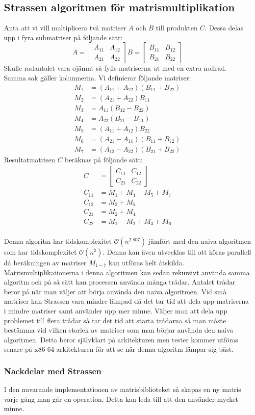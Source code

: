 \subsection{Strassen algoritmen för matrismultiplikation}
\label{sec:strassen}
Anta att vi vill multiplicera två matriser $A$ och $B$ till produkten $C$. Dessa delas upp i fyra submatriser på följande sätt:
 $$A=\begin{bmatrix}
A_{11} & A_{12} \\
A_{21}& A_{22}
 \end{bmatrix}
 B=\begin{bmatrix}
B_{11} & B_{12} \\
B_{21}& B_{22}
 \end{bmatrix}
 $$
 Skulle radantalet vara ojämnt så fylls matriserna ut med en extra nollrad. Samma sak gäller kolumnerna.
 Vi definierar följande matriser:
  \begin{align}
  M_1 & =(A_{11}+A_{22})(B_{11}+B_{22}) \\
  M_2 & =(A_{21}+A_{22})B_{11} \\
  M_3 & =A_{11}(B_{12}-B_{22}) \\
  M_4 & =A_{22}(B_{21}-B_{11}) \\
  M_5 & =(A_{11}+A_{12})B_{22} \\
  M_6 & =(A_{21}-A_{11})(B_{11}+B_{12}) \\
  M_7 & =(A_{12}-A_{22})(B_{21}+B_{22}) 
 \end{align}
 Resultatmatrisen $C$ beräknas på följande sätt:
   \begin{align}
    C & =\begin{bmatrix}
C_{11} & C_{12} \\
C_{21}& C_{22}
 \end{bmatrix} \\
  C_{11} & =M_1+M_4-M_5+M_7 \\
  C_{12} & = M_3+M_5 \\
  C_{21} & = M_2+M_4 \\
  C_{22} & = M_1-M_2+M_3+M_6
 \end{align}
 \\
Denna algoritm har tidskomplexitet $\mathcal{O}(n^{2.807})$ jämfört med den naiva algoritmen som har tidskomplexitet $\mathcal{O}(n^{3})$. Denna kan även utvecklas till att köras parallell då beräkningen av matriser $M_{1-7}$ kan utföras helt åtskilda. Matrismultiplikationerna i denna algoritmen kan sedan rekursivt använda samma algoritm och på så sätt kan processen använda många trådar. Antalet trådar beror på när man väljer att börja använda den naiva algoritmen. Vid små matriser kan Strassen vara mindre lämpad då det tar tid att dela upp matriserna i mindre matriser samt använder upp mer minne. Väljer man att dela upp problemet till flera trådar så tar det tid att starta trådarna så man måste bestämma vid vilken storlek av matriser som man börjar använda den naiva algoritmen. Detta beror självklart på arkitekturen men tester kommer utföras senare på x86-64 arkitekturen för att se när denna algoritm lämpar sig bäst. 
 \subsubsection{Nackdelar med Strassen}
 I den nuvarande implementationen av matrisbiblioteket så skapas en ny matris varje gång man går en operation. Detta kan leda till att den använder mycket minne.
 

 
 
